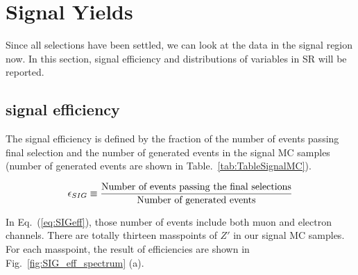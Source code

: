 \section{Signal Yields}
Since all selections have been settled, we can look at the data in the signal region now. In this section, signal efficiency and distributions of variables in SR will be reported. 

\subsection{signal efficiency}
The signal efficiency is defined by the fraction of the number of events passing final selection and the number of generated events in the signal MC samples (number of generated events are shown in Table.~\ref{tab:TableSignalMC}). 

\begin{align}
  \label{eq:SIGeff}
  \epsilon_{SIG}\equiv \frac{\textup{Number of events passing the final selections}}{\textup{Number of generated events}}
\end{align}

In Eq.~(\ref{eq:SIGeff}), those number of events include both muon and electron channels. There are totally thirteen masspoints of $Z'$ in our signal MC samples. For each masspoint, the result of efficiencies are shown in Fig.~\ref{fig:SIG_eff_spectrum} (a).


